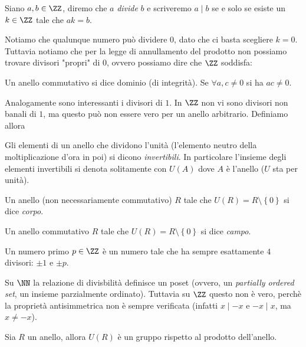 \documentclass[11pt]{scrartcl}
\begin{document}
	\begin{definition}[Divisibilità]
		Siano $a,b\in\ZZ$, diremo che $a$ \textit{divide} $b$ e scriveremo $a\mid b$ se e solo se esiste un $k\in\ZZ$ tale che $ak=b$.
	\end{definition}
	Notiamo che qualunque numero può dividere $0$, dato che ci basta scegliere $k=0$. Tuttavia notiamo che per la legge di annullamento del prodotto non possiamo trovare divisori "propri" di $0$, ovvero possiamo dire che $\ZZ$ soddisfa:
	\begin{definition}
		Un anello commutativo si dice dominio (di integrità). Se $\forall a,c\ne 0$ si ha $ac\ne 0$.
	\end{definition}
	Analogamente sono interessanti i divisori di $1$. In $\ZZ$ non vi sono divisori non banali di $1$, ma questo può non essere vero per un anello arbitrario. Definiamo allora
	\begin{definition}
		Gli elementi di un anello che dividono l'unità (l'elemento neutro della moltiplicazione d'ora in poi) si dicono \textit{invertibili}. In particolare l'insieme degli elementi invertibili si denota solitamente con $U(A)$ dove $A$ è l'anello ($U$ sta per unità).
	\end{definition}
	\begin{definition}[Corpo]
		Un anello (non necessariamente commutativo) $R$ tale che $U(R)=R\setminus\left\{0\right\}$ si dice \textit{corpo}.
	\end{definition}
	\begin{definition}[Campo]
		Un anello commutativo $R$ tale che $U(R)=R\setminus\left\{0\right\}$ si dice \textit{campo}.
	\end{definition}
	\begin{definition}
		Un numero primo $p\in\ZZ$ è un numero tale che ha sempre esattamente $4$ divisori: $\pm 1$ e $\pm p$. 
	\end{definition}
	\begin{example}
		Su $\NN$ la relazione di divisbilità definisce un poset (ovvero, un \textit{partially ordered set}, un insieme parzialmente ordinato). Tuttavia su $\ZZ$ questo non è vero, perchè la proprietà antisimmetrica non è sempre verificata (infatti $x\mid -x$ e $-x\mid x$, ma $x\ne -x$).
	\end{example}
	\begin{lemma}[$U(R)$ è un gruppo]
		Sia $R$ un anello, allora $U(R)$ è un gruppo rispetto al prodotto dell'anello.
	\end{lemma}
\end{document}
